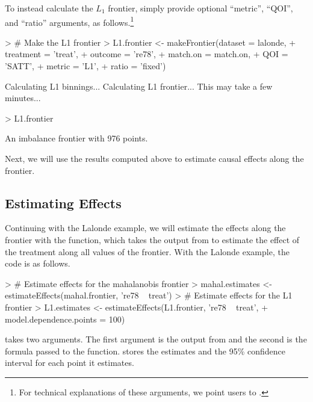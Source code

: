 \documentclass[nojss]{jss}
\begin{document}
To instead calculate the $L_1$ frontier, simply
provide optional ``metric'', ``QOI'', and ``ratio'' arguments, as
follows.\footnote{For technical explanations of these arguments, we
  point users to \citet{kingND}.}

\begin{Schunk}
\begin{Sinput}
> # Make the L1 frontier
> L1.frontier <- makeFrontier(dataset = lalonde, 
+                             treatment = 'treat', 
+                             outcome = 're78', 
+                             match.on = match.on,
+                             QOI = 'SATT',
+                             metric = 'L1',
+                             ratio = 'fixed')
\end{Sinput}
\begin{Soutput}
Calculating L1 binnings...
Calculating L1 frontier... This may take a few minutes...
\end{Soutput}
\begin{Sinput}
> L1.frontier
\end{Sinput}
\begin{Soutput}
An imbalance frontier with 976 points.
\end{Soutput}
\end{Schunk}

Next, we will use the results computed above to estimate causal
effects along the frontier.

\subsection{Estimating Effects}

Continuing with the Lalonde example, we will estimate the effects
along the frontier with the  function, which
takes the output from  to estimate the effect of
the treatment along all values of the frontier. With the Lalonde
example, the code is as follows.

\begin{Schunk}
\begin{Sinput}
> # Estimate effects for the mahalanobis frontier
> mahal.estimates <- estimateEffects(mahal.frontier, 're78 ~ treat')
> # Estimate effects for the L1 frontier
> L1.estimates <- estimateEffects(L1.frontier, 're78 ~ treat',
+                                 model.dependence.points = 100)
\end{Sinput}
\end{Schunk}

 takes two arguments. The first argument is
the output from  and the second is the formula
passed to the  function.  stores the
estimates and the 95\% confidence interval for each point it
estimates.
\end{document}
